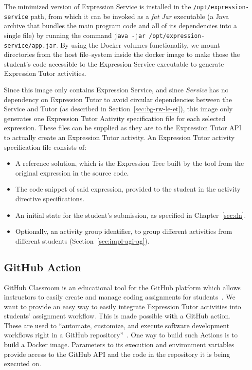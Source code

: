 \begin{chapterBody}
The minimized version of Expression Service is installed in the
\texttt{/opt/expression-service} path, from which it can be invoked as a
\textit{fat Jar} executable (a Java archive that bundles the main program code 
and all of its dependencies into a single file) by running the command
\texttt{java -jar /opt/expression-service/app.jar}.
By using the Docker volumes functionality, we mount directories from the host
file–system inside the docker image to make those the student's code accessible
to the Expression Service executable to generate Expression Tutor activities.

Since this image only contains Expression Service, and since \textit{Service}
has no dependency on Expression Tutor to avoid circular dependencies between
the Service and Tutor (as described in Section~\ref{sec:bg-rw-le-et}), this
image only generates one Expression Tutor Aativity specification file for each
selected expression.
These files can be supplied as they are to the Expression Tutor API to actually
create an Expression Tutor activity.
An Expression Tutor activity specification file consists of:

\begin{itemize}
    \item A reference solution, which is the Expression Tree built by the tool 
from the original expression in the source code.
    \item The code snippet of said expression, provided to the student in the
activity directive specifications.
    \item An initial state for the student's submission, as specified in
Chapter~\ref{sec:dn}.
    \item Optionally, an activity group identifier, to group different
activities from different students (Section~\ref{sec:impl-agi-ag}). 
\end{itemize}

\subsection{GitHub Action}\label{sec:impl-aag-gh}

GitHub Classroom is an educational tool for the GitHub platform which allows
instructors to easily create and manage coding assignments for
students~\cite{github_inc_2020_2020}. We want to provide an easy way to easily
integrate Expression Tutor activities into students' assignment workflow.
This is made possible with a GitHub action. These are used to ``automate,
customize, and execute software development workflows right in a GitHub
repository''~\cite{github_inc_github_2023}. One way to build such Actions is to
build a Docker image. Parameters to its execution and environment variables
provide access to the GitHub API and the code in the repository it is being
executed on.


\end{chapterBody}
